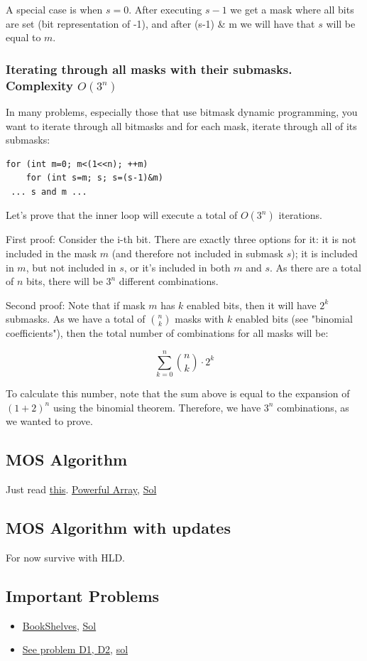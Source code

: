 \documentclass[8pt, a4paper, oneside, twocolumn]{extarticle}
\begin{document}
A special case is when $s = 0$. After executing $s-1$ we get a mask where all bits are set (bit representation of -1), and after (s-1) \& m we will have that $s$ will be equal to $m$. 
\subsubsection{Iterating through all masks with their submasks. Complexity $O(3^n)$}

In many problems, especially those that use bitmask dynamic programming, you want to iterate through all bitmasks and for each mask, iterate through all of its submasks:
\begin{verbatim}
for (int m=0; m<(1<<n); ++m)
	for (int s=m; s; s=(s-1)&m)
 ... s and m ...
\end{verbatim}
Let's prove that the inner loop will execute a total of $O(3^n)$ iterations.

First proof: Consider the i-th bit. There are exactly three options for it: it is not included in the mask $m$ (and therefore not included in submask $s$); it is included in $m$, but not included in $s$, or it's included in both $m$ and $s$. As there are a total of $n$ bits, there will be $3^n$ different combinations.

Second proof: Note that if mask $m$ has $k$ enabled bits, then it will have $2^k$ submasks. As we have a total of $\binom{n}{k}$ masks with $k$ enabled bits (see "binomial coefficients"), then the total number of combinations for all masks will be:

$$\sum_{k=0}^n \binom{n}{k} \cdot 2^k$$

To calculate this number, note that the sum above is equal to the expansion of $(1+2)^n$ using the binomial theorem. Therefore, we have $3^n$ combinations, as we wanted to prove.
\subsection{MOS Algorithm}
Just read \href{https://blog.anudeep2011.com/mos-algorithm/}{this}. \href{https://codeforces.com/contest/86/problem/D}{Powerful Array}, \href{https://codeforces.com/contest/86/submission/39212866}{Sol}
\subsection{MOS Algorithm with updates}
For now survive with HLD.
\subsection{Important Problems}
\begin{itemize}
    \item \href{https://codeforces.com/contest/981/problem/D}{BookShelves}, \href{https://codeforces.com/contest/981/submission/38660572}{Sol}
    \item \href{https://codeforces.com/contest/1092}{See problem D1, D2}, \href{https://codeforces.com/blog/entry/63961}{sol}
\end{itemize}
\end{document}
